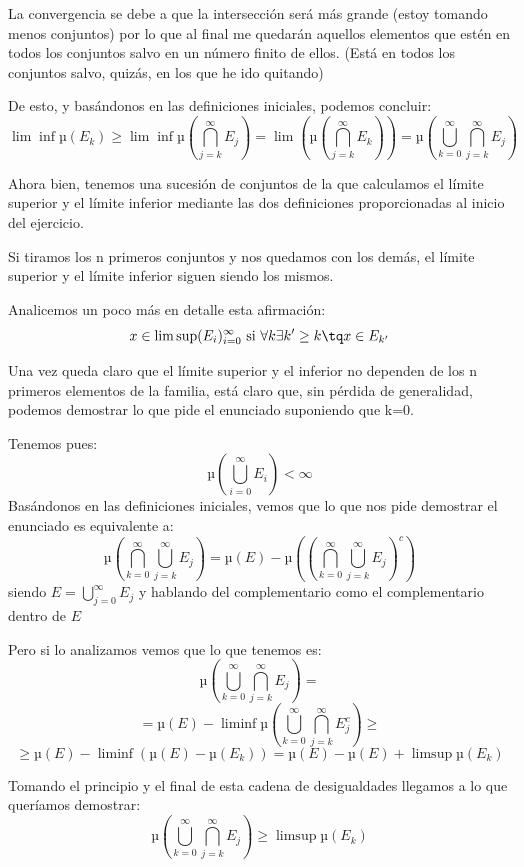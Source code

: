 \begin{problem}[6]
La convergencia se debe a que la intersección será más grande (estoy tomando menos conjuntos) por lo que al final me quedarán aquellos elementos que estén en todos los conjuntos salvo en un número finito de ellos. (Está en todos los conjuntos salvo, quizás, en los que he ido quitando)

De esto, y basándonos en las definiciones iniciales, podemos concluir:
\[\lim \inf µ(E_k) \geq \lim \inf µ(\bigcap_{j=k}^{\infty}E_j) = \lim (µ(\bigcap_{j=k}^{\infty}E_k))=µ(\bigcup_{k=0}^{\infty}\bigcap_{j=k}^{\infty}E_j)\]

Ahora bien, tenemos una sucesión de conjuntos de la que calculamos el límite superior y el límite inferior mediante las dos definiciones proporcionadas al inicio del ejercicio.

Si tiramos los n primeros conjuntos y nos quedamos con los demás, el límite superior y el límite inferior siguen siendo los mismos.

Analicemos un poco más en detalle esta afirmación:
\[x \in \lim \sup (E_i)_{i=0}^{\infty} \text{ si } \forall k \exists k' \geq k \tq x \in E_{k'}\]

Una vez queda claro que el límite superior y el inferior no dependen de los n primeros elementos de la familia, está claro que, sin pérdida de generalidad, podemos demostrar lo que pide el enunciado suponiendo que k=0.

Tenemos pues:
\[µ(\bigcup_{i=0}^{\infty} E_i)< \infty\]
Basándonos en las definiciones iniciales, vemos que lo que nos pide demostrar el enunciado es equivalente a:
\[µ(\bigcap_{k=0}^{\infty}\bigcup_{j=k}^{\infty}E_j)= µ(E)-µ((\bigcap_{k=0}^{\infty}\bigcup_{j=k}^{\infty}E_j)^c)\]
siendo $E=\bigcup_{j=0}^{\infty}E_j$ y hablando del complementario como el complementario dentro de $E$

Pero si lo analizamos vemos que lo que tenemos es:
\[µ(\bigcup_{k=0}^{\infty}\bigcap_{j=k}^{\infty}E_j)=\]
\[=µ(E)-\liminf µ(\bigcup_{k=0}^{\infty}\bigcap_{j=k}^{\infty}E^c_j) \geq \]
\[\geq µ(E)-\liminf(µ(E)-µ(E_k))=µ(E)-µ(E)+\limsup µ(E_k)\]

Tomando el principio y el final de esta cadena de desigualdades llegamos a lo que queríamos demostrar:
\[µ(\bigcup_{k=0}^{\infty}\bigcap_{j=k}^{\infty}E_j)\geq\limsup µ(E_k)\]
\end{problem}

